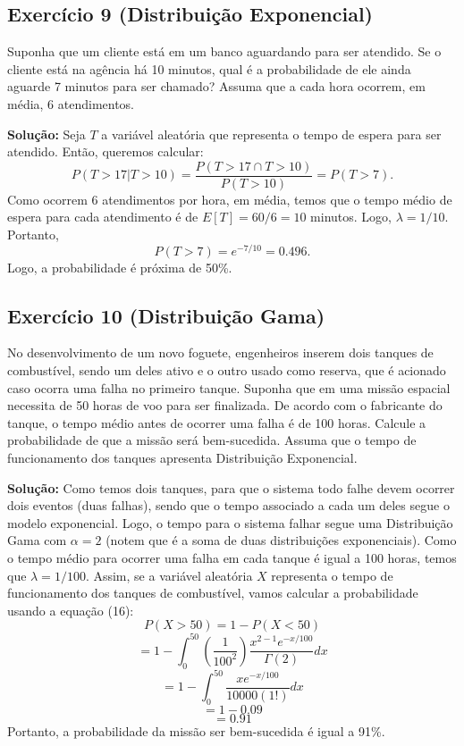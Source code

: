 \documentclass{article}
\begin{document}
\subsection{Exercício 9 (Distribuição Exponencial)}
Suponha que um cliente está em um banco aguardando para ser atendido. Se o cliente está na agência há 10 minutos, qual é a probabilidade de ele ainda aguarde 7 minutos para ser chamado? Assuma que a cada hora ocorrem, em média, 6 atendimentos.

\vspace{0.5cm}
\textbf{Solução:}
Seja $T$ a variável aleatória que representa o tempo de espera para ser atendido. Então, queremos calcular:
    $$
    P(T > 17 | T > 10) = \frac{P(T > 17 \cap T > 10)}{P(T > 10)}
    = P(T > 7).
    $$
Como ocorrem 6 atendimentos por hora, em média, temos que o tempo médio de espera para cada atendimento é de $E[T] = 60/6 = 10$ minutos. Logo, $\lambda = 1/10$. Portanto,
    $$
    P(T > 7) = e^{-7/10}
    = 0.496.
    $$
Logo, a probabilidade é próxima de 50\%.

\subsection{Exercício 10 (Distribuição Gama)}
No desenvolvimento de um novo foguete, engenheiros inserem dois tanques de combustível, sendo um deles ativo e o outro usado como reserva, que é acionado caso ocorra uma falha no primeiro tanque. Suponha que em uma missão espacial necessita de 50 horas de voo para ser finalizada. De acordo com o fabricante do tanque, o tempo médio antes de ocorrer uma falha é de 100 horas. Calcule a probabilidade de que a missão será bem-sucedida. Assuma que o tempo de funcionamento dos tanques apresenta Distribuição Exponencial.

\vspace{0.5cm}
\textbf{Solução:} Como temos dois tanques, para que o sistema todo falhe devem ocorrer dois eventos (duas falhas), sendo que o tempo associado a cada um deles segue o modelo exponencial. Logo, o tempo para o sistema falhar segue uma Distribuição Gama com $\alpha = 2$ (notem que é a soma de duas distribuições exponenciais). Como o tempo médio para ocorrer uma falha em cada tanque é igual a 100 horas, temos que $\lambda = 1/100$. Assim, se a variável aleatória $X$ representa o tempo de funcionamento dos tanques de combustível, vamos calcular a probabilidade usando a equação (16):
    $$
    P(X > 50) = 1 - P(X < 50)
    $$
    $$
    = 1 - \int_{0}^{50} 
    \left(\frac{1}{100^2}\right)\frac{x^{2-1} e^{-x/100}}{\Gamma(2)} dx
    $$
    $$
    = 1 - \int_{0}^{50} 
    \frac{x e^{-x/100}}{10000 (1!)} dx
    $$
    $$
    = 1 - 0.09
    $$
    $$
    = 0.91
    $$
Portanto, a probabilidade da missão ser bem-sucedida é igual a 91\%.
\end{document}
